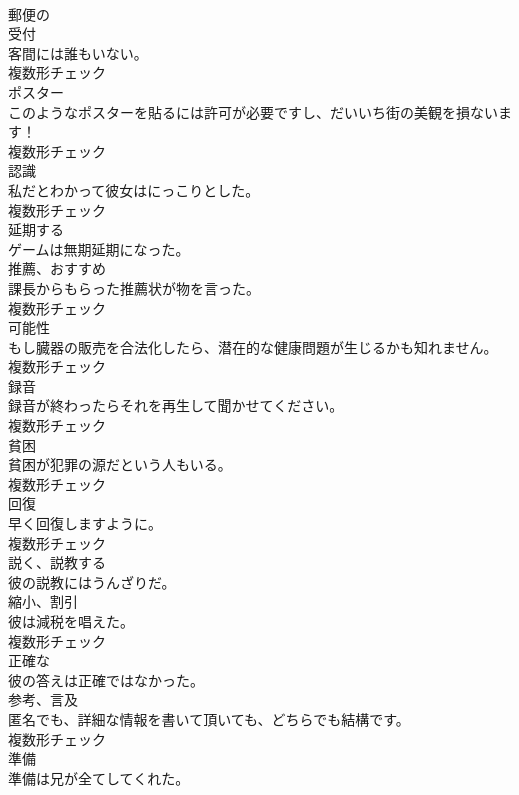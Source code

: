 \documentclass[8pt]{extreport}
\begin{document}
\begin{CJK}{UTF8}{min}
\\	[形容詞]	郵便の	
\\	[名詞]	受付	
\\	客間には誰もいない。	
\\	複数形チェック
\\	[名詞]	ポスター	
\\	このようなポスターを貼るには許可が必要ですし、だいいち街の美観を損ないます！	
\\	複数形チェック
\\	[名詞]	認識	
\\	私だとわかって彼女はにっこりとした。	
\\	複数形チェック
\\	[動詞]	延期する	
\\	ゲームは無期延期になった。	
\\	[名詞]	推薦、おすすめ	
\\	課長からもらった推薦状が物を言った。	
\\	複数形チェック
\\	[名詞]	可能性	
\\	もし臓器の販売を合法化したら、潜在的な健康問題が生じるかも知れません。	
\\	複数形チェック
\\	[名詞]	録音	
\\	録音が終わったらそれを再生して聞かせてください。	
\\	複数形チェック
\\	[名詞]	貧困	
\\	貧困が犯罪の源だという人もいる。	
\\	複数形チェック
\\	[名詞]	回復	
\\	早く回復しますように。	
\\	複数形チェック
\\	[動詞]	説く、説教する	
\\	彼の説教にはうんざりだ。	
\\	[名詞]	縮小、割引	
\\	彼は減税を唱えた。	
\\	複数形チェック
\\	[形容詞]	正確な	
\\	彼の答えは正確ではなかった。	
\\	[名詞]	参考、言及	
\\	匿名でも、詳細な情報を書いて頂いても、どちらでも結構です。	
\\	複数形チェック
\\	[名詞]	準備	
\\	準備は兄が全てしてくれた。	

\end{CJK}
\end{document}
